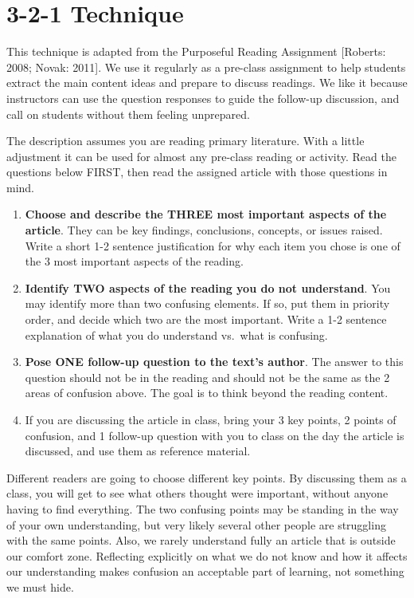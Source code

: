 \documentclass[
]{book}
\begin{document}
\hypertarget{technique}{%
\section{3-2-1 Technique}\label{technique}}

This technique is adapted from the Purposeful Reading Assignment {[}Roberts: 2008; Novak: 2011{]}. We use it regularly as a pre-class assignment to help students extract the main content ideas and prepare to discuss readings. We like it because instructors can use the question responses to guide the follow-up discussion, and call on students without them feeling unprepared.

The description assumes you are reading primary literature. With a little adjustment it can be used for almost any pre-class reading or activity. Read the questions below FIRST, then read the assigned article with those questions in mind.

\begin{enumerate}
\def\labelenumi{\arabic{enumi}.}
\item
  \textbf{Choose and describe the THREE most important aspects of the article}. They can be key findings, conclusions, concepts, or issues raised. Write a short 1-2 sentence justification for why each item you chose is one of the 3 most important aspects of the reading.
\item
  \textbf{Identify TWO aspects of the reading you do not understand}. You may identify more than two confusing elements. If so, put them in priority order, and decide which two are the most important. Write a 1-2 sentence explanation of what you do understand vs.~what is confusing.
\item
  \textbf{Pose ONE follow-up question to the text's author}. The answer to this question should not be in the reading and should not be the same as the 2 areas of confusion above. The goal is to think beyond the reading content.
\item
  If you are discussing the article in class, bring your 3 key points, 2 points of confusion, and 1 follow-up question with you to class on the day the article is discussed, and use them as reference material.
\end{enumerate}

Different readers are going to choose different key points. By discussing them as a class, you will get to see what others thought were important, without anyone having to find everything. The two confusing points may be standing in the way of your own understanding, but very likely several other people are struggling with the same points. Also, we rarely understand fully an article that is outside our comfort zone. Reflecting explicitly on what we do not know and how it affects our understanding makes confusion an acceptable part of learning, not something we must hide.
\end{document}
